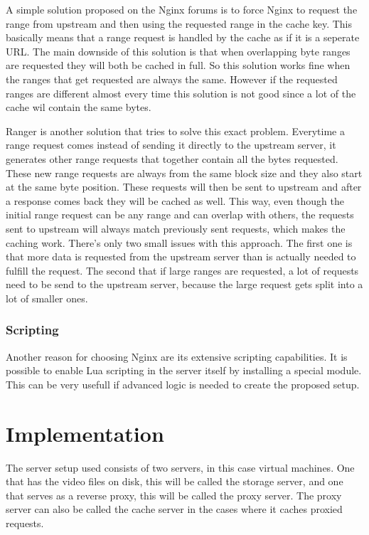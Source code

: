 \documentclass[twoside,openright]{uva-bachelor-thesis}
\begin{document}
A simple solution proposed on the Nginx forums\autocite{nginxcacheforum} is to
force Nginx to request the range from upstream and then using the requested
range in the cache key. This basically means that a range request is handled by
the cache as if it is a seperate URL. The main downside of this solution is that
when overlapping byte ranges are requested they will both be cached in full. So
this solution works fine when the ranges that get requested are always the same.
However if the requested ranges are different almost every time this solution is
not good since a lot of the cache wil contain the same bytes.


Ranger\autocite{ranger} is another solution that tries to solve this exact
problem. Everytime a range request comes instead of sending it directly to the
upstream server, it generates other range requests that together contain all the
bytes requested. These new range requests are always from the same block size
and they also start at the same byte position. These requests will then be
sent to upstream and after a response comes back they will be cached as well.
This way, even though the initial range request can be any range and can overlap
with others, the requests sent to upstream will always match previously sent
requests, which makes the caching work. There's only two small issues with this
approach. The first one is that more data is requested from the upstream server
than is actually needed to fulfill the request. The second that if large
ranges are requested, a lot of requests need to be send to the upstream server,
because the large request gets split into a lot of smaller ones.



\subsection{Scripting}
Another reason for choosing Nginx are its extensive scripting capabilities. It
is possible to enable Lua scripting in the server itself by installing a special
module\autocite{nginxlua}. This can be very usefull if advanced logic is needed
to create the proposed setup.





\chapter{Implementation}
The server setup used consists of two servers, in this case virtual machines.
One that has the video files on disk, this will be called the storage server,
and one that serves as a reverse proxy, this will be called the proxy server.
The proxy server can also be called the cache server in the cases where it
caches proxied requests.
\end{document}

